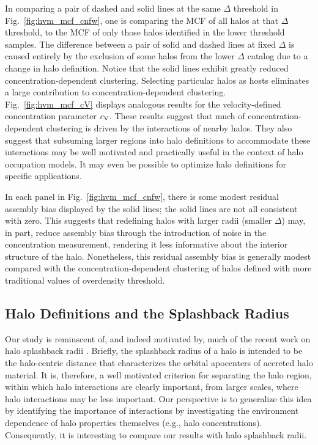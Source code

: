 \documentclass[usenatbib,fleqn]{mnras}
\begin{document}
In comparing a pair of dashed and solid lines at the same $\Delta$ threshold in Fig.~\ref{fig:hvm_mcf_cnfw}, one is comparing the MCF of all halos at that $\Delta$ threshold, to the MCF of only those halos identified in the lower threshold samples. The difference between a pair of solid and dashed lines at fixed $\Delta$ is caused entirely by the exclusion of some halos from the lower $\Delta$ catalog due to a change in halo definition. Notice that the solid lines exhibit greatly reduced concentration-dependent clustering. Selecting particular halos as hosts eliminates a large contribution to concentration-dependent clustering. Fig.~\ref{fig:hvm_mcf_cV} displays analogous results for the velocity-defined concentration parameter $c_{\rm V}$. These results suggest that much of concentration-dependent clustering is driven by the interactions of nearby halos. They also suggest that subsuming larger regions into halo definitions to accommodate these interactions may be well motivated and practically useful in the context of halo occupation models. It may even be possible to optimize halo definitions for specific applications. 

In each panel in Fig.~\ref{fig:hvm_mcf_cnfw}, there is some modest residual assembly bias displayed by the solid lines; the solid lines are not all consistent with zero. This suggests that redefining halos with larger radii (smaller $\Delta$) may, in part, reduce assembly bias through the introduction of noise in the concentration measurement, rendering it less informative about the interior structure of the halo. Nonetheless, this residual assembly bias is generally modest compared with the concentration-dependent clustering of halos defined with more traditional values of overdensity threshold.

\subsection{Halo Definitions and the Splashback Radius}

Our study is reminscent of, and indeed motivated by, much of the recent work on halo splashback radii \citep{more_etal15,mansfield_etal16,diemer_etal17}. Briefly, the splashback radius of a halo is intended to be the halo-centric distance that characterizes the orbital apocenters of accreted halo material. It is, therefore, a well motivated criterion for separating the halo region, within which halo interactions are clearly important, from larger scales, where halo interactions may be less important. Our perspective is to generalize this idea by identifying the importance of interactions by investigating the environment dependence of halo properties themselves (e.g., halo concentrations). Consequently, it is interesting to compare our results with halo splashback radii. 
\end{document}
